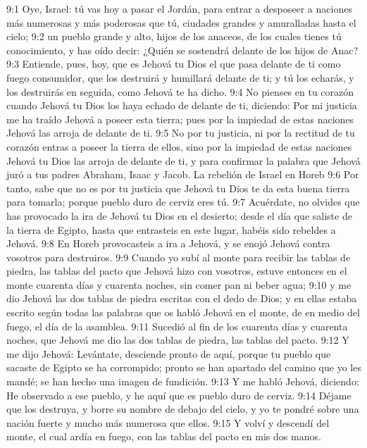 9:1 Oye, Israel: tú vas hoy a pasar el Jordán, para entrar a desposeer a naciones más numerosas y más poderosas que tú, ciudades grandes y amuralladas hasta el cielo;  
9:2 un pueblo grande y alto, hijos de los anaceos, de los cuales tienes tú conocimiento, y has oído decir: ¿Quién se sostendrá delante de los hijos de Anac?  
9:3 Entiende, pues, hoy, que es Jehová tu Dios el que pasa delante de ti como fuego consumidor, que los destruirá y humillará delante de ti; y tú los echarás, y los destruirás en seguida, como Jehová te ha dicho.  
9:4 No pienses en tu corazón cuando Jehová tu Dios los haya echado de delante de ti, diciendo: Por mi justicia me ha traído Jehová a poseer esta tierra; pues por la impiedad de estas naciones Jehová las arroja de delante de ti.  
9:5 No por tu justicia, ni por la rectitud de tu corazón entras a poseer la tierra de ellos, sino por la impiedad de estas naciones Jehová tu Dios las arroja de delante de ti, y para confirmar la palabra que Jehová juró a tus padres Abraham, Isaac y Jacob.  
La rebelión de Israel en Horeb   
9:6 Por tanto, sabe que no es por tu justicia que Jehová tu Dios te da esta buena tierra para tomarla; porque pueblo duro de cerviz eres tú. 
9:7 Acuérdate, no olvides que has provocado la ira de Jehová tu Dios en el desierto; desde el día que saliste de la tierra de Egipto, hasta que entrasteis en este lugar, habéis sido rebeldes a Jehová.  
9:8 En Horeb provocasteis a ira a Jehová, y se enojó Jehová contra vosotros para destruiros.  
9:9 Cuando yo subí al monte para recibir las tablas de piedra, las tablas del pacto que Jehová hizo con vosotros, estuve entonces en el monte cuarenta días y cuarenta noches, sin comer pan ni beber agua;  
9:10 y me dio Jehová las dos tablas de piedra escritas con el dedo de Dios; y en ellas estaba escrito según todas las palabras que os habló Jehová en el monte, de en medio del fuego, el día de la asamblea.  
9:11 Sucedió al fin de los cuarenta días y cuarenta noches, que Jehová me dio las dos tablas de piedra, las tablas del pacto.  
9:12 Y me dijo Jehová: Levántate, desciende pronto de aquí, porque tu pueblo que sacaste de Egipto se ha corrompido; pronto se han apartado del camino que yo les mandé; se han hecho una imagen de fundición.  
9:13 Y me habló Jehová, diciendo: He observado a ese pueblo, y he aquí que es pueblo duro de cerviz.  
9:14 Déjame que los destruya, y borre su nombre de debajo del cielo, y yo te pondré sobre una nación fuerte y mucho más numerosa que ellos.  
9:15 Y volví y descendí del monte, el cual ardía en fuego, con las tablas del pacto en mis dos manos.  

